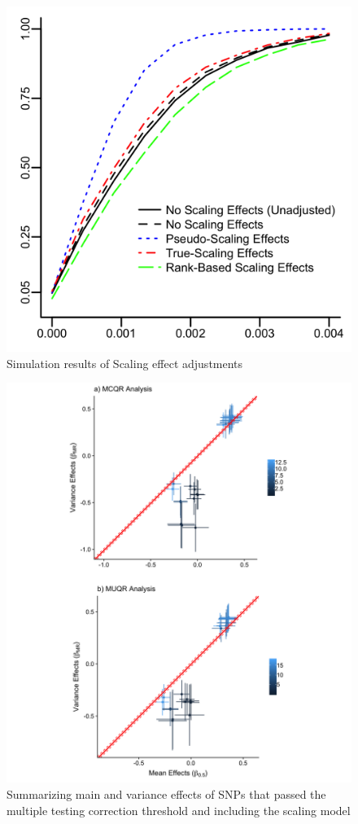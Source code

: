 \documentclass[12pt]{article}
\begin{document}
\newpage
\begin{figure}[h!]
	\centering
	\includegraphics[width=0.6 \textwidth, height=0.6\textwidth]{Figures/Power_Curves_Scaling_Adjusted.png}
	\caption{Simulation results of Scaling effect adjustments}
	\label{fig:ScaleEffPower}
\end{figure}

\begin{figure}[h!]
	\centering
	\includegraphics[width=1.2\textwidth, height=1.2\textwidth]{Figures/Main_Variance_Effects_w_Scaling_Model.png}
	\caption{Summarizing main and variance effects of SNPs that passed the multiple testing correction threshold and including the scaling model}
	\label{fig:MainVarianceEffectsSelectSNPs}
\end{figure}
\end{document}
